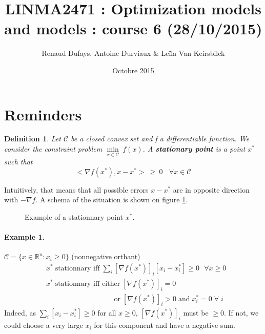 \documentclass[a4paper]{article}
\title{LINMA2471 : Optimization models and models : course 6 (28/10/2015)}
\author{Renaud Dufays, Antoine Durviaux \& Leïla Van Keirsbilck}
\date{Octobre 2015}
\begin{document}
\maketitle

\section{Reminders}
\newtheorem{def1}{Definition} 
\begin{def1}
Let $\mathcal{C}$ be a closed convex set and f a differentiable function. We consider the constraint problem $\underset{x\in \mathcal{C}}{\min}\ f(x)$. A \textbf{stationary point} is a point $x^*$ such that
\begin{equation*}
<\nabla f(x^*), x-x^*>\ \geq\ 0 \ \ \ \ \forall x \in \mathcal{C}
\end{equation*}
\end{def1}
Intuitively, that means that all possible errors $x-x^*$ are in opposite direction with $-\nabla f$. A schema of the situation is shown on figure \ref{tik1}.
\begin{figure}[H]
\centering
{}
\caption{Example of a stationnary point $x^*$.}
\label {tik1}
\end{figure}

\paragraph{Example 1.} $\mathcal{C} = \{x \in \mathbb{R}^n: x_i \ge 0\}$ (nonnegative orthant)
\begin{align*}
&x^* \; \text{stationnary iff} \; \sum_i \left[\nabla f(x^*)\right]_i \left[x_i - x_i^*\right] \ge 0\ \ \ \forall x\ge 0\\
&x^* \; \text{stationnary iff either} \; [\nabla f(x^*)]_i=0\\ 
&\phantom{x^* \; \text{stationnary iff eith}}\text{or} \; [\nabla f(x^*)]_i>0 \; \text{and} \; x_i^*=0 \; \forall \; i
\end{align*}
Indeed, as $\sum_i [x_i - x_i^*] \ge 0$ for all $x\ge0$,  $[\nabla f(x^*)]_i$ must be $\ge 0$.
If not, we could choose a very large $x_i$ for this component and have a negative sum.
\end{document}
